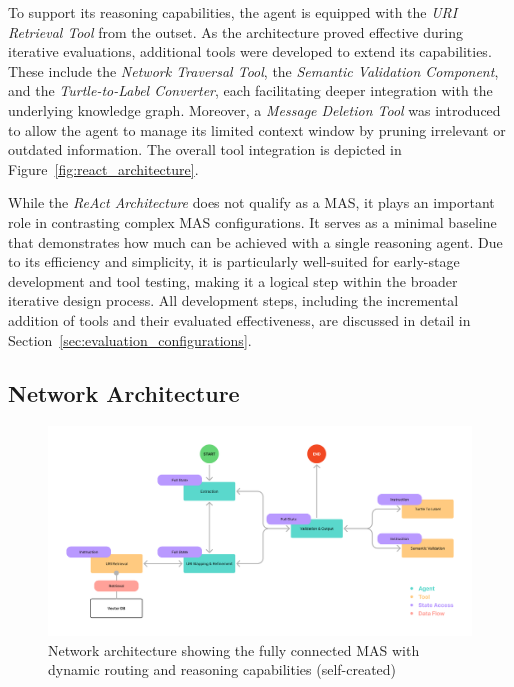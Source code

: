 \documentclass[a4paper,oneside,bibliography=totoc]{scrbook}
\begin{document}
To support its reasoning capabilities, the agent is equipped with the \textit{URI Retrieval Tool} from the outset. As the architecture proved effective during iterative evaluations, additional tools were developed to extend its capabilities. These include the \textit{Network Traversal Tool}, the \textit{Semantic Validation Component}, and the \textit{Turtle-to-Label Converter}, each facilitating deeper integration with the underlying knowledge graph. Moreover, a \textit{Message Deletion Tool} was introduced to allow the agent to manage its limited context window by pruning irrelevant or outdated information. The overall tool integration is depicted in Figure~\ref{fig:react_architecture}.

While the \textit{ReAct Architecture} does not qualify as a \ac{MAS}, it plays an important role in contrasting complex \ac{MAS} configurations. It serves as a minimal baseline that demonstrates how much can be achieved with a single reasoning agent. Due to its efficiency and simplicity, it is particularly well-suited for early-stage development and tool testing, making it a logical step within the broader iterative design process. All development steps, including the incremental addition of tools and their evaluated effectiveness, are discussed in detail in Section~\ref{sec:evaluation_configurations}.

\subsection{Network Architecture}
\label{subsec:network}

\begin{figure}[tp]
  \centering
  \includegraphics[width=\textwidth]{figures/Network Architecture.png}
  \caption[Network architecture showing the fully connected \ac{MAS} with dynamic routing and reasoning capabilities]{Network architecture showing the fully connected \ac{MAS} with dynamic routing and reasoning capabilities (self-created)}
  \label{fig:network_architecture}
\end{figure}
\end{document}
